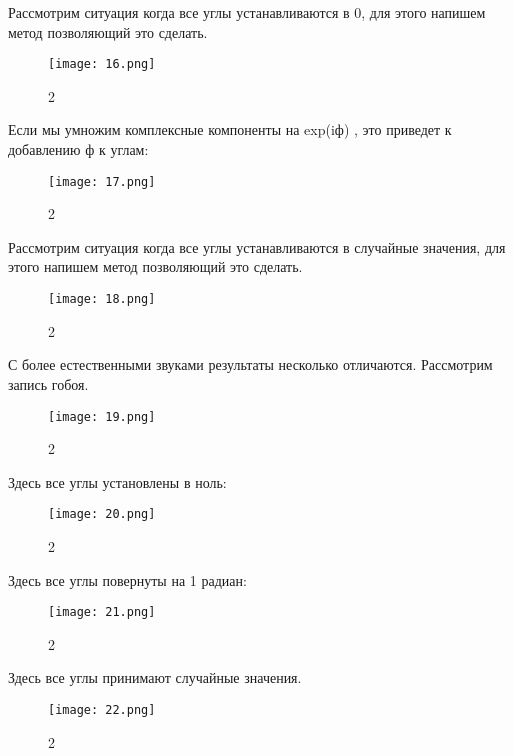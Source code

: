 \documentclass[10pt,a4paper,oneside]{article}
\begin{document}
Рассмотрим ситуация когда все углы устанавливаются в 0, для этого напишем метод позволяющий это сделать.

\begin{figure}[H]
        \centering
        \texttt{[image: 16.png]}
        \caption{2}
        \label{fig:first}
\end{figure}

Если мы умножим комплексные компоненты на exp(iф) , это приведет к добавлению ф к углам:

\begin{figure}[H]
        \centering
        \texttt{[image: 17.png]}
        \caption{2}
        \label{fig:first}
\end{figure}

Рассмотрим ситуация когда все углы устанавливаются в случайные значения, для этого напишем метод позволяющий это сделать.

\begin{figure}[H]
        \centering
        \texttt{[image: 18.png]}
        \caption{2}
        \label{fig:first}
\end{figure}

С более естественными звуками результаты несколько отличаются. Рассмотрим запись гобоя.

\begin{figure}[H]
        \centering
        \texttt{[image: 19.png]}
        \caption{2}
        \label{fig:first}
\end{figure}

Здесь все углы установлены в ноль:

\begin{figure}[H]
        \centering
        \texttt{[image: 20.png]}
        \caption{2}
        \label{fig:first}
\end{figure}

Здесь все углы повернуты на 1 радиан: 

\begin{figure}[H]
        \centering
        \texttt{[image: 21.png]}
        \caption{2}
        \label{fig:first}
\end{figure}

Здесь все углы принимают случайные значения.

\begin{figure}[H]
        \centering
        \texttt{[image: 22.png]}
        \caption{2}
        \label{fig:first}
\end{figure}
\end{document}
